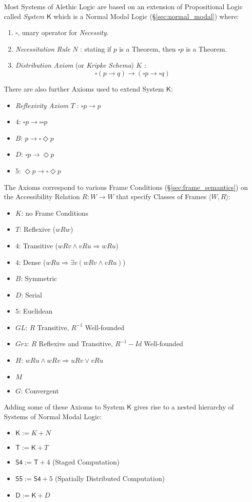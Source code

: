 Most Systems of Alethic Logic are based on an extension of
Propositional Logic called \emph{System $\mathsf{K}$} which is a
Normal Modal Logic (\S\ref{sec:normal_modal}) where:
\begin{enumerate}
\item $\square$, unary operator for \emph{Necessity}.
\item \emph{Necessitation Rule} $N$ : stating if $p$ is a
  Theorem, then $\square p$ is a Theorem.
\item \emph{Distribution Axiom} (or \emph{Kripke Schema}) $K$ :
  \[
    \square(p \rightarrow q) \rightarrow
    (\square p \rightarrow \square q)
  \]
\end{enumerate}
There are also further Axioms used to extend System $\mathsf{K}$:
\begin{itemize}
  \item \emph{Reflexivity Axiom} $T$ : $\square p \rightarrow p$
  \item $4$: $\square p \rightarrow \square \square p$
  \item $B$: $p \rightarrow \square \Diamond p$
  \item $D$: $\square p \rightarrow \Diamond p$
  \item $5$: $\Diamond p \rightarrow \square \Diamond p$
\end{itemize}
The Axioms correspond to various Frame Conditions
(\S\ref{sec:frame_semantics}) on the Accessibility Relation $R : W
\rightarrow W$ that specify Classes of Frames $\langle W,R \rangle$:
\begin{itemize}
  \item $K$: no Frame Conditions
  \item $T$: Reflexive ($wRw$)
  \item $4$: Transitive ($wRv \wedge vRu \Rightarrow wRu$)
  \item $4$: Dense ($wRu \Rightarrow \exists v (w R v \wedge v R u)$)
  \item $B$: Symmetric
  \item $D$: Serial
  \item $5$: Euclidean
  \item $GL$: $R$ Transitive, $R^{-1}$ Well-founded
  \item $Grz$: $R$ Reflexive and Transitive, $R^{-1} - Id$
    Well-founded
  \item $H$: $w R u \wedge w R v \Rightarrow u R v \vee v R u$
  \item $M$
  \item $G$: Convergent
\end{itemize}
Adding some of these Axioms to System $\mathsf{K}$ gives rise to a
nested hierarchy of Systems of Normal Modal Logic:
\begin{itemize}
  \item $\mathsf{K} := K + N$
  \item $\mathsf{T} := \mathsf{K} + T$
  \item $\mathsf{S4} := \mathsf{T} + 4$ (Staged Computation)
    \cite{wadler14}
  \item $\mathsf{S5} := \mathsf{S4} + 5$
    (Spatially Distributed Computation) \cite{wadler14}
  \item $\mathsf{D} := \mathsf{K} + D$
\end{itemize}

